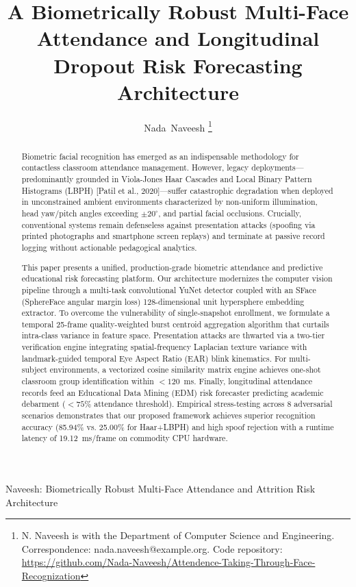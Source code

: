 \documentclass[journal,10pt,twocolumn]{IEEEtran}
\begin{document}
\title{A Biometrically Robust Multi-Face Attendance and Longitudinal Dropout Risk Forecasting Architecture}

\author{Nada~Naveesh
\thanks{N. Naveesh is with the Department of Computer Science and Engineering. Correspondence: nada.naveesh@example.org. Code repository: \url{https://github.com/Nada-Naveesh/Attendence-Taking-Through-Face-Recognization}}}

%
{Naveesh: Biometrically Robust Multi-Face Attendance and Attrition Risk Architecture}

\maketitle

\begin{abstract}
Biometric facial recognition has emerged as an indispensable methodology for contactless classroom attendance management. However, legacy deployments---predominantly grounded in Viola-Jones Haar Cascades and Local Binary Pattern Histograms (LBPH) [Patil et al., 2020]---suffer catastrophic degradation when deployed in unconstrained ambient environments characterized by non-uniform illumination, head yaw/pitch angles exceeding $\pm 20^\circ$, and partial facial occlusions. Crucially, conventional systems remain defenseless against presentation attacks (spoofing via printed photographs and smartphone screen replays) and terminate at passive record logging without actionable pedagogical analytics.

This paper presents a unified, production-grade biometric attendance and predictive educational risk forecasting platform. Our architecture modernizes the computer vision pipeline through a multi-task convolutional YuNet detector coupled with an SFace (SphereFace angular margin loss) 128-dimensional unit hypersphere embedding extractor. To overcome the vulnerability of single-snapshot enrollment, we formulate a temporal 25-frame quality-weighted burst centroid aggregation algorithm that curtails intra-class variance in feature space. Presentation attacks are thwarted via a two-tier verification engine integrating spatial-frequency Laplacian texture variance with landmark-guided temporal Eye Aspect Ratio (EAR) blink kinematics. For multi-subject environments, a vectorized cosine similarity matrix engine achieves one-shot classroom group identification within $<120$~ms. Finally, longitudinal attendance records feed an Educational Data Mining (EDM) risk forecaster predicting academic debarment ($<75\%$ attendance threshold). Empirical stress-testing across 8 adversarial scenarios demonstrates that our proposed framework achieves superior recognition accuracy (85.94\% vs. 25.00\% for Haar+LBPH) and high spoof rejection with a runtime latency of 19.12~ms/frame on commodity CPU hardware.
\end{abstract}
\end{document}
